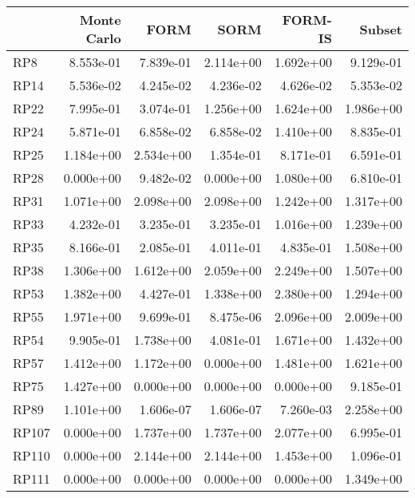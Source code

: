 \begin{tabular}{lrrrrr}
\toprule
{} &  Monte Carlo &      FORM &      SORM &   FORM-IS &    Subset \\
\midrule
RP8                       &    8.553e-01 & 7.839e-01 & 2.114e+00 & 1.692e+00 & 9.129e-01 \\
RP14                      &    5.536e-02 & 4.245e-02 & 4.236e-02 & 4.626e-02 & 5.353e-02 \\
RP22                      &    7.995e-01 & 3.074e-01 & 1.256e+00 & 1.624e+00 & 1.986e+00 \\
RP24                      &    5.871e-01 & 6.858e-02 & 6.858e-02 & 1.410e+00 & 8.835e-01 \\
RP25                      &    1.184e+00 & 2.534e+00 & 1.354e-01 & 8.171e-01 & 6.591e-01 \\
RP28                      &    0.000e+00 & 9.482e-02 & 0.000e+00 & 1.080e+00 & 6.810e-01 \\
RP31                      &    1.071e+00 & 2.098e+00 & 2.098e+00 & 1.242e+00 & 1.317e+00 \\
RP33                      &    4.232e-01 & 3.235e-01 & 3.235e-01 & 1.016e+00 & 1.239e+00 \\
RP35                      &    8.166e-01 & 2.085e-01 & 4.011e-01 & 4.835e-01 & 1.508e+00 \\
RP38                      &    1.306e+00 & 1.612e+00 & 2.059e+00 & 2.249e+00 & 1.507e+00 \\
RP53                      &    1.382e+00 & 4.427e-01 & 1.338e+00 & 2.380e+00 & 1.294e+00 \\
RP55                      &    1.971e+00 & 9.699e-01 & 8.475e-06 & 2.096e+00 & 2.009e+00 \\
RP54                      &    9.905e-01 & 1.738e+00 & 4.081e-01 & 1.671e+00 & 1.432e+00 \\
RP57                      &    1.412e+00 & 1.172e+00 & 0.000e+00 & 1.481e+00 & 1.621e+00 \\
RP75                      &    1.427e+00 & 0.000e+00 & 0.000e+00 & 0.000e+00 & 9.185e-01 \\
RP89                      &    1.101e+00 & 1.606e-07 & 1.606e-07 & 7.260e-03 & 2.258e+00 \\
RP107                     &    0.000e+00 & 1.737e+00 & 1.737e+00 & 2.077e+00 & 6.995e-01 \\
RP110                     &    0.000e+00 & 2.144e+00 & 2.144e+00 & 1.453e+00 & 1.096e-01 \\
RP111                     &    0.000e+00 & 0.000e+00 & 0.000e+00 & 0.000e+00 & 1.349e+00 \\

\end{tabular}
